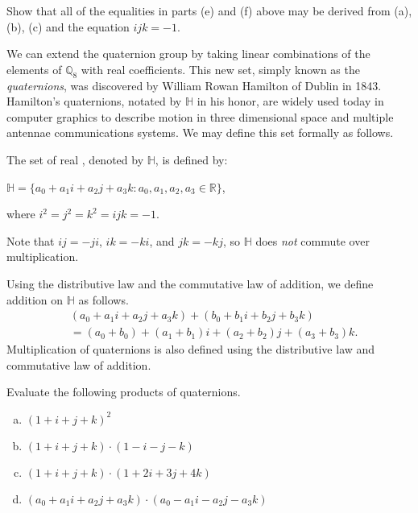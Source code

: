 \begin{exercise}
Show that all of the equalities in parts (e) and (f) above may be derived from (a), (b), (c) and the equation $ijk=-1$. 
\end{exercise}

We can extend the quaternion group by taking linear combinations of the elements of ${\mathbb Q}_8$ with real coefficients.  This new set, simply known as the \emph{quaternions}, was discovered by William Rowan Hamilton of Dublin in 1843.  Hamilton's quaternions, notated by ${\mathbb H}$ in his honor, are widely used today in computer graphics to describe motion in three dimensional space and multiple antennae communications systems.  We may define this set formally as follows.

\begin{defn}\label{quaternionring}
The set of real , denoted by ${\mathbb H}$, is defined by:
\begin{center}
${\mathbb H}=\{a_0+a_1i+a_2j+a_3k:a_0,a_1,a_2,a_3\in {\mathbb R}\}$,

where $i^2=j^2=k^2=ijk=-1$.
\end{center}

Note that $ij=-ji$, $ik=-ki$, and $jk=-kj$, so ${\mathbb H}$ does \emph{not} commute over multiplication.

Using the distributive law and the commutative law of addition, we define addition on ${\mathbb H}$ as follows.
\begin{equation}
\begin{aligned}
&(a_0+a_1i+a_2j+a_3k)+(b_0+b_1i+b_2j+b_3k)\\
&=(a_0+b_0)+(a_1+b_1)i+(a_2+b_2)j+(a_3+b_3)k.
\end{aligned}
\end{equation}
Multiplication of quaternions is also defined using the distributive law and commutative law of addition.
\end{defn}

\begin{exercise}
Evaluate the following products of quaternions.
\begin{enumerate}[(a)]
\item $(1+i+j+k)^2$
\item $(1+i+j+k)\cdot (1-i-j-k)$
\item $(1+i+j+k) \cdot (1+2i+3j+4k)$
\item $(a_0+a_1i+a_2j+a_3k)\cdot (a_0-a_1i-a_2j-a_3k)$
\end{enumerate}
\end{exercise}


